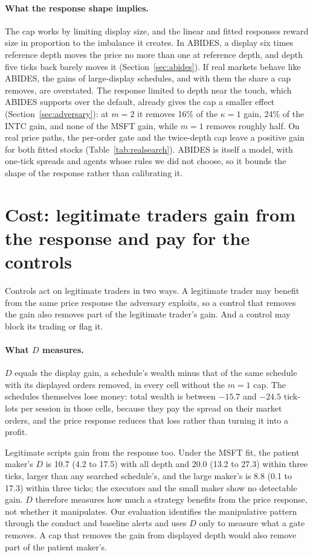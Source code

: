 \documentclass{article}
\begin{document}
\paragraph{What the response shape implies.} The cap works by limiting display size, and the linear and fitted responses reward size in proportion to the imbalance it creates. In ABIDES, a display six times reference depth moves the price no more than one at reference depth, and depth five ticks back barely moves it (Section~\ref{sec:abides}). If real markets behave like ABIDES, the gains of large-display schedules, and with them the share a cap removes, are overstated. The response limited to depth near the touch, which ABIDES supports over the default, already gives the cap a smaller effect (Section~\ref{sec:adversary}): at $m = 2$ it removes 16\% of the $\kappa = 1$ gain, 24\% of the INTC gain, and none of the MSFT gain, while $m = 1$ removes roughly half. On real price paths, the per-order gate and the twice-depth cap leave a positive gain for both fitted stocks (Table~\ref{tab:realsearch}). ABIDES is itself a model, with one-tick spreads and agents whose rules we did not choose, so it bounds the shape of the response rather than calibrating it.

\section{Cost: legitimate traders gain from the response and pay for the controls}\label{sec:cost}

Controls act on legitimate traders in two ways. A legitimate trader may benefit from the same price response the adversary exploits, so a control that removes the gain also removes part of the legitimate trader's gain. And a control may block its trading or flag it.

\paragraph{What $D$ measures.} $D$ equals the display gain, a schedule's wealth minus that of the same schedule with its displayed orders removed, in every cell without the $m = 1$ cap. The schedules themselves lose money: total wealth is between $-15.7$ and $-24.5$ tick-lots per session in those cells, because they pay the spread on their market orders, and the price response reduces that loss rather than turning it into a profit.

Legitimate scripts gain from the response too. Under the MSFT fit, the patient maker's $D$ is 10.7 (4.2 to 17.5) with all depth and 20.0 (13.2 to 27.3) within three ticks, larger than any searched schedule's, and the large maker's is 8.8 (0.1 to 17.3) within three ticks; the executors and the small maker show no detectable gain. $D$ therefore measures how much a strategy benefits from the price response, not whether it manipulates. Our evaluation identifies the manipulative pattern through the conduct and baseline alerts and uses $D$ only to measure what a gate removes. A cap that removes the gain from displayed depth would also remove part of the patient maker's.
\end{document}
